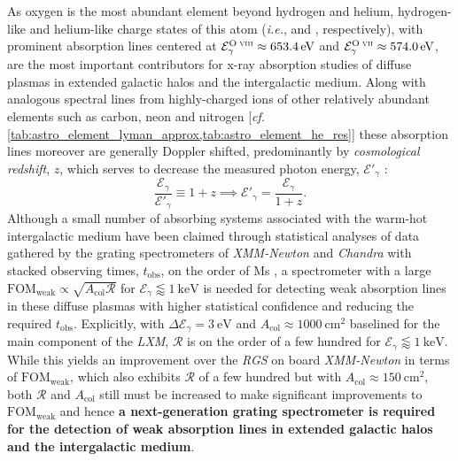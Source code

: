 As oxygen is the most abundant element beyond hydrogen and helium, hydrogen-like and helium-like charge states of this atom (\emph{i.e.},  and , respectively), with prominent absorption lines centered at $\mathcal{E}_{\gamma}^{\text{O$\;${\scshape{viii}}}} \approx \SI{653.4}{\electronvolt}$ and $\mathcal{E}_{\gamma}^{\text{O$\;${\scshape{vii}}}} \approx \SI{574.0}{\electronvolt}$, are the most important contributors for x-ray absorption studies of diffuse plasmas in extended galactic halos and the intergalactic medium. %
Along with analogous spectral lines from highly-charged ions of other relatively abundant elements such as carbon, neon and nitrogen [\emph{cf.\@} \cref{tab:astro_element_lyman_approx,tab:astro_element_he_res}] these absorption lines moreover are generally Doppler shifted, predominantly by \emph{cosmological redshift}, $z$, which serves to decrease the measured photon energy, $\mathcal{E}'_{\gamma}$ \cite{Liddle03,Carroll07}: 
\begin{equation}\label{eq:energy_shift}
 \frac{\mathcal{E}_{\gamma}}{\mathcal{E}'_{\gamma}} \equiv 1 + z \implies \mathcal{E}'_{\gamma} = \frac{\mathcal{E}_{\gamma}}{1+z}.
 \end{equation}
Although a small number of absorbing  systems associated with the warm-hot intergalactic medium have been claimed through statistical analyses of data gathered by the grating spectrometers of \emph{XMM-Newton} and \emph{Chandra} with stacked observing times, $t_{\text{obs}}$, on the order of \si{\mega\second} \cite{Nicastro18,Kovacs19}, a spectrometer with a large $\text{FOM}_{\text{weak}} \propto \sqrt{A_{\text{col}} \mathscr{R}}$ for $\mathcal{E}_{\gamma} \lessapprox \SI{1}{\kilo\electronvolt}$ is needed for detecting weak absorption lines in these diffuse plasmas with higher statistical confidence and reducing the required $t_{\text{obs}}$. 
Explicitly, with $\Delta \mathcal{E}_{\gamma} = \SI{3}{\electronvolt}$ and $A_{\text{col}} \approx \SI{1000}{\cm\squared}$ baselined for the main component of the \emph{LXM}, $\mathscr{R}$ is on the order of a few hundred for $\mathcal{E}_{\gamma} \lessapprox \SI{1}{\kilo\electronvolt}$. 
While this yields an improvement over the \emph{RGS} on board \emph{XMM-Newton} in terms of $\text{FOM}_{\text{weak}}$, which also exhibits $\mathscr{R}$ of a few hundred but with $A_{\text{col}} \approx \SI{150}{\cm\squared}$, both $\mathscr{R}$ and $A_{\text{col}}$ still must be increased to make significant improvements to $\text{FOM}_{\text{weak}}$ and hence \textbf{a next-generation grating spectrometer is required for the detection of weak absorption lines in extended galactic halos and the intergalactic medium}. 

